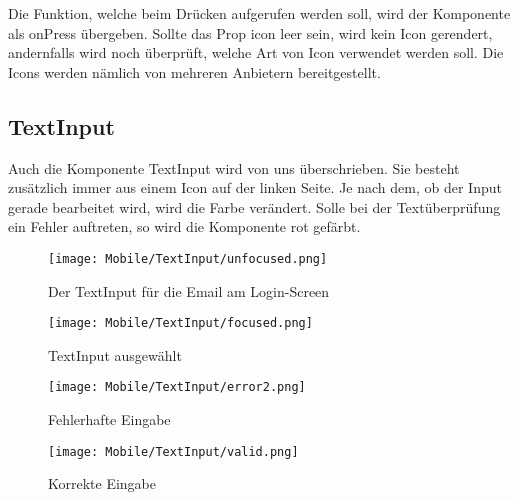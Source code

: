Die Funktion, welche beim Drücken aufgerufen werden soll, wird der Komponente als onPress übergeben.
Sollte das Prop icon leer sein, wird kein Icon gerendert, andernfalls wird noch überprüft, welche
Art von Icon verwendet werden soll. Die Icons werden nämlich von mehreren Anbietern bereitgestellt.

\newpage
\subsection{TextInput}
Auch die Komponente TextInput wird von uns überschrieben. Sie besteht zusätzlich immer aus einem
Icon auf der linken Seite. Je nach dem, ob der Input gerade bearbeitet wird, wird die Farbe
verändert. Solle bei der Textüberprüfung ein Fehler auftreten, so wird die Komponente rot gefärbt.

\begin{figure}[H]
  \begin{center}
    \texttt{[image: Mobile/TextInput/unfocused.png]}
    \caption{Der TextInput für die Email am Login-Screen}
  \end{center}
\end{figure}

\begin{figure}[H]
  \begin{center}
    \texttt{[image: Mobile/TextInput/focused.png]}
    \caption{TextInput ausgewählt}
  \end{center}
\end{figure}


\begin{figure}[H]
  \begin{center}
    \texttt{[image: Mobile/TextInput/error2.png]}
    \caption{Fehlerhafte Eingabe}
  \end{center}
\end{figure}

\begin{figure}[H]
  \begin{center}
    \texttt{[image: Mobile/TextInput/valid.png]}
    \caption{Korrekte Eingabe}
  \end{center}
\end{figure}